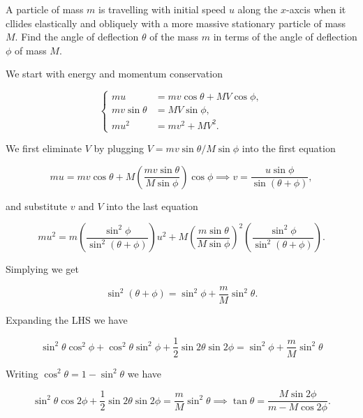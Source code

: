 \documentclass[a4paper,12pt]{report}
\begin{document}
{A particle of mass \(m\)  is travelling with initial speed \(u\)  along the \(x\)-axcis when it cllides elastically and obliquely with a more massive stationary particle of mass \(M\). Find the angle of deflection \(\theta \) of the mass \(m\) in terms of the angle of deflection \(\phi \) of mass \(M\).}
{We start with energy and momentum conservation 

\begin{equation}
	\begin{cases}
		mu &= mv \cos \theta + MV \cos \phi ,\\
		mv \sin \theta &= MV \sin \phi ,\\
		mu ^2&=mv^2+MV^2.
	\end{cases}
\end{equation}

We first eliminate \(V\)  by plugging \(V = mv \sin \theta /M\sin \phi \) into the first equation

\begin{equation}
		mu = mv\cos \theta + M\left( \frac{mv\sin \theta }{M\sin \phi }  \right)\cos \phi \implies v = \frac{u \sin \phi }{\sin (\theta +\phi )},
\end{equation}

and substitute \(v \text { and } V\) into the last equation

\begin{equation}
	mu^2= m\left( \frac{\sin ^2\phi }{\sin ^2(\theta +\phi )}  \right)u^2+M\left( \frac{m\sin \theta }{M\sin \phi }  \right)^2\left( \frac{\sin ^2\phi }{\sin ^2(\theta +\phi )}  \right).
\end{equation}

Simplying we get 

\begin{equation}
	\sin ^2(\theta +\phi ) = \sin ^2\phi + \frac{m}{M} \sin ^2\theta .
\end{equation}

Expanding the LHS we have 

\begin{equation}
	\sin ^2\theta \cos ^2\phi +\cos ^2\theta \sin ^2\phi + \frac{1}{2} \sin 2\theta \sin 2\phi = \sin ^2\phi + \frac{m}{M} \sin ^2\theta 
\end{equation}

Writing \(\cos ^2\theta = 1-\sin ^2\theta \) we have 

\begin{equation}
	\sin ^2\theta \cos 2\phi + \frac{1}{2} \sin 2\theta \sin 2\phi = \frac{m}{M} \sin ^2\theta \implies \tan \theta = \frac{M\sin 2\phi }{m - M\cos 2\phi }. 
\end{equation}
~
} 
\end{document}
